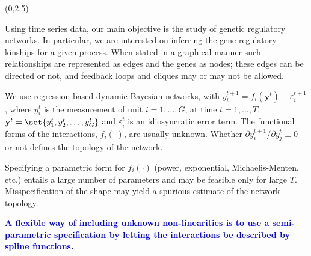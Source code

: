 \documentclass[a0,portrait]{a0poster}
\def\LHead#1{\noindent{\LARGE\color{DarkBlue} #1}\smallskip}
\newcommand{\bl}[1] {\ensuremath{\mathbf{#1}}\xspace}
\begin{document}
\begin{textblock}{7}(0,2.5)

	\LHead{Introduction}

	Using time series data, our main objective is the study of genetic regulatory networks. In particular, we are interested on inferring the gene regulatory kinships for a given process.  When stated in a graphical manner such relationships are represented as edges and the genes as nodes;  these edges can be directed or not, and feedback loops and cliques may or may not be allowed.

	We use regression based dynamic Bayesian networks, with $y_i^{t+1} = f_i (\bl y^t) + \varepsilon_i^{t+1}$, where $y_i^{t}$ is the measurement of unit $i = 1, \dots, G$, at time $t = 1, \dots, T$, $\bl y^t = \set{ y_1^t,  y_2^t, \dots, y^t_G}$ and $\varepsilon_i^t$ is an idiosyncratic error term.  The functional forms of the interactions, $f_i(\cdot)$, are usually unknown.  Whether $\partial y_i^{t+1} / \partial y_j^t \equiv 0$ or not defines the topology of the network.

	Specifying a parametric form for $f_i(\cdot)$ (power, exponential, Michaelis-Menten, etc.) entails a large number of parameters and may be feasible only for large $T$.  Misspecification of the shape may yield a spurious estimate of the network topology.

	\textbf{\textcolor{blue}{A flexible way of including unknown non-linearities is to use a semi-parametric specification by letting the interactions be described by spline functions.}} 
\end{textblock}
\end{document}
